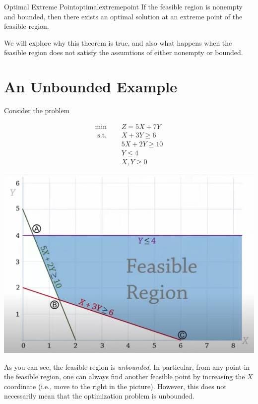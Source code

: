 \begin{theorem}{Optimal Extreme Point}{optimalextremepoint}
If the feasible region is nonempty and bounded, then there exists an optimal solution at an extreme point of the feasible region.
\end{theorem}

We will explore why this theorem is true, and also what happens when the feasible region does not satisfy the assumtions of either nonempty or bounded.






\section{An Unbounded Example}

Consider the problem

\begin{align*}
\min \quad & Z =5 X+7 Y  \\ 
\text { s.t. } \quad & X+3 Y \geq 6 \\ 
&5 X+ 2 Y \geq 10 \\ 
&Y  \leq 4 \\ 
&X, Y  \geq 0 
\end{align*}

\begin{center}
\includegraphics[scale = 0.4]{screenshots/example1-feasible-region}
\end{center}

As you can see, the feasible region is \emph{unbounded}.  In particular, from any point in the feasible region, one can always find another feasible point by increasing the $X$ coordinate (i.e., move to the right in the picture).   However, this does not necessarily mean that the optimization problem is unbounded.


